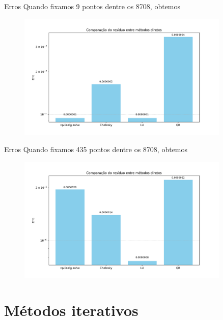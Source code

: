 \documentclass[11pt]{beamer}
\begin{document}
\begin{frame}{Erros}
    Quando fixamos 9 pontos dentre os 8708, obtemos
    \begin{figure}[htb]
        \label{fig:erros_diretos_9pontos}
        \centering
        \includegraphics[width=0.9\textwidth]{../figs/fig8.pdf}
    \end{figure}
\end{frame}

\begin{frame}{Erros}
    Quando fixamos 435 pontos dentre os 8708, obtemos
    \begin{figure}[htb]
        \label{fig:erros_diretos_435pontos}
        \centering
        \includegraphics[width=0.9\textwidth]{../figs/fig14.pdf}
    \end{figure}
\end{frame}

\section{Métodos iterativos}
\end{document}
